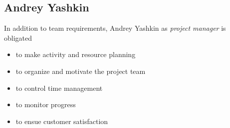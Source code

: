 \subsection{Andrey Yashkin}
In addition to team requirements, Andrey Yashkin as \textit{project manager} is obligated 
\begin{itemize}
	\item to make activity and resource planning
	\item to organize and motivate the project team
	\item to control time management
	\item to monitor progress
	\item to ensue customer satisfaction
\end{itemize}